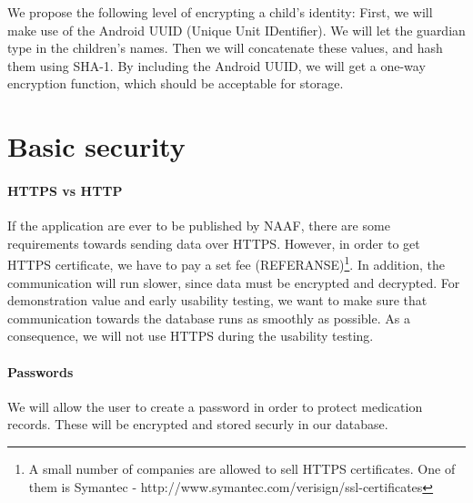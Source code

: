 We propose the following level of encrypting a child's identity:
First, we will make use of the Android UUID (Unique Unit IDentifier). We will let the guardian type in the children's names. Then we will concatenate these values, and hash them using SHA-1\cite{sha1}. By including the Android UUID, we will get a one-way encryption function, which should be acceptable for storage.
 


\section{Basic security}
\paragraph{HTTPS vs HTTP} If the application are ever to be published by NAAF, there are some requirements towards sending data over HTTPS. However, in order to get HTTPS certificate, we have to pay a set fee (REFERANSE)\footnote{A small number of companies are allowed to sell HTTPS certificates. One of them is Symantec - http://www.symantec.com/verisign/ssl-certificates}. In addition, the communication will run slower, since data must be encrypted and decrypted. For demonstration value and early usability testing, we want to make sure that communication towards the database runs as smoothly as possible. As a consequence, we will not use HTTPS during the usability testing.


\paragraph{Passwords}
We will allow the user to create a password in order to protect medication records. These will be encrypted and stored securly in our database. 
